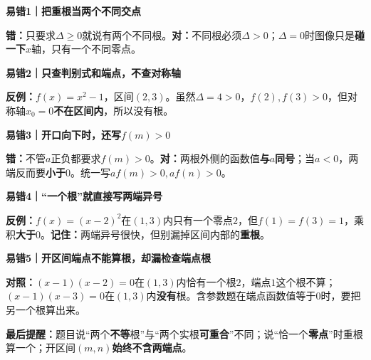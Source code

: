 \begin{trapbox}
\textbf{\textcolor{CTrap}{易错1｜把重根当两个不同交点}}\par
\textbf{错：}只要求$\Delta\ge0$就说有两个不同根。\textbf{对：}不同根必须$\Delta>0$；$\Delta=0$时图像只是\textbf{碰一下}$x$轴，只有一个不同零点。
\begin{center}

\end{center}

\medskip
\textbf{\textcolor{CTrap}{易错2｜只查判别式和端点，不查对称轴}}\par
\textbf{反例：}$f(x)=x^2-1$，区间$(2,3)$。虽然$\Delta=4>0$，$f(2),f(3)>0$，但对称轴$x_0=0$\textbf{不在区间内}，所以没有根。
\begin{center}

\end{center}

\medskip
\textbf{\textcolor{CTrap}{易错3｜开口向下时，还写$f(m)>0$}}\par
\textbf{错：}不管$a$正负都要求$f(m)>0$。\textbf{对：}两根外侧的函数值\textbf{与$a$同号}；当$a<0$，两端反而要\textbf{小于$0$}。统一写$af(m)>0,af(n)>0$。
\begin{center}

\end{center}

\medskip
\textbf{\textcolor{CTrap}{易错4｜“一个根”就直接写两端异号}}\par
\textbf{反例：}$f(x)=(x-2)^2$在$(1,3)$内只有一个零点$2$，但$f(1)=f(3)=1$，乘积\textbf{大于$0$}。\textbf{记住：}两端异号很快，但别漏掉区间内部的\textbf{重根}。
\begin{center}

\end{center}

\medskip
\textbf{\textcolor{CTrap}{易错5｜开区间端点不能算根，却漏检查端点根}}\par
\textbf{对照：}$(x-1)(x-2)=0$在$(1,3)$内恰有一个根$2$，端点$1$这个根不算；$(x-1)(x-3)=0$在$(1,3)$内\textbf{没有}根。含参数题在端点函数值等于$0$时，要把另一个根算出来。
\begin{center}

\end{center}
\textbf{\textcolor{CTrap}{最后提醒：}}题目说“两个\textbf{不等}根”与“两个实根\textbf{可重合}”不同；说“恰一个\textbf{零点}”时重根算一个；开区间$(m,n)$\textbf{始终不含两端点}。
\end{trapbox}
